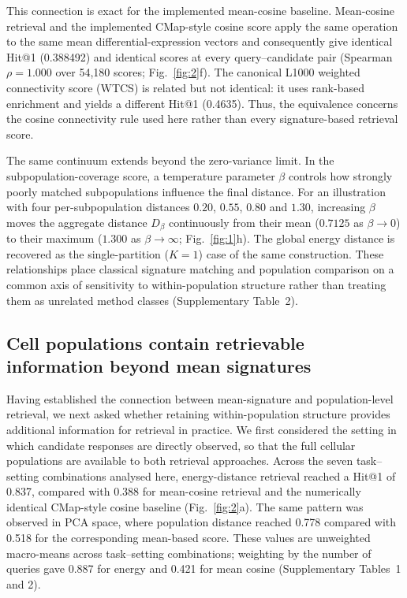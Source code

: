 \documentclass[11pt,letterpaper]{article}
\begin{document}
This connection is exact for the implemented mean-cosine baseline. Mean-cosine retrieval and the implemented CMap-style cosine score apply the same operation to the same mean differential-expression vectors and consequently give identical Hit@1 (0.388492) and identical scores at every query--candidate pair (Spearman $\rho=1.000$ over 54,180 scores; Fig.~\ref{fig:2}f). The canonical L1000 weighted connectivity score (WTCS) is related but not identical: it uses rank-based enrichment and yields a different Hit@1 (0.4635). Thus, the equivalence concerns the cosine connectivity rule used here rather than every signature-based retrieval score.

The same continuum extends beyond the zero-variance limit. In the subpopulation-coverage score, a temperature parameter $\beta$ controls how strongly poorly matched subpopulations influence the final distance. For an illustration with four per-subpopulation distances $0.20$, $0.55$, $0.80$ and $1.30$, increasing $\beta$ moves the aggregate distance $D_\beta$ continuously from their mean ($0.7125$ as $\beta\to0$) to their maximum ($1.300$ as $\beta\to\infty$; Fig.~\ref{fig:1}h). The global energy distance is recovered as the single-partition ($K=1$) case of the same construction. These relationships place classical signature matching and population comparison on a common axis of sensitivity to within-population structure rather than treating them as unrelated method classes (Supplementary Table~2).




\subsection*{Cell populations contain retrievable information beyond mean signatures}

Having established the connection between mean-signature and population-level retrieval, we next asked whether retaining within-population structure provides additional information for retrieval in practice. We first considered the setting in which candidate responses are directly observed, so that the full cellular populations are available to both retrieval approaches. Across the seven task--setting combinations analysed here, energy-distance retrieval reached a Hit@1 of 0.837, compared with 0.388 for mean-cosine retrieval and the numerically identical CMap-style cosine baseline\cite{ref1,ref2} (Fig.~\ref{fig:2}a). The same pattern was observed in PCA space, where population distance reached 0.778 compared with 0.518 for the corresponding mean-based score. These values are unweighted macro-means across task--setting combinations; weighting by the number of queries gave 0.887 for energy and 0.421 for mean cosine (Supplementary Tables~1 and 2).
\end{document}
